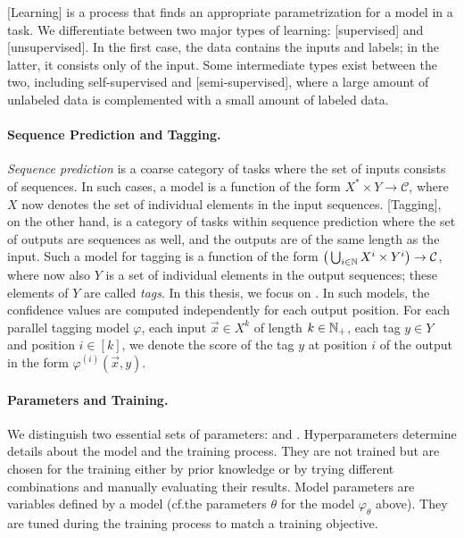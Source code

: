 \documentclass[../document.tex]{subfiles}
\begin{document}
    [Learning] is a process that finds an appropriate parametrization for a model in a task.
    We differentiate between two major types of learning: [supervised] and [unsupervised].
    In the first case, the data contains the inputs and labels; in the latter, it consists only of the input.
    Some intermediate types exist between the two, including self-supervised and [semi-supervised], where a large amount of unlabeled data is complemented with a small amount of labeled data.

    \paragraph{Sequence Prediction and Tagging.}
    \emph{Sequence prediction} is a coarse category of tasks where the set of inputs consists of sequences.
    In such cases, a model is a function of the form \(X^* \times Y \to \mathcal{C}\), where \(X\) now denotes the set of individual elements in the input sequences.
    [Tagging], on the other hand, is a category of tasks within sequence prediction where the set of outputs are sequences as well, and the outputs are of the same length as the input.
    Such a model for tagging is a function of the form \(\big( \bigcup_{i \in \mathbb{N}} X^i \times Y^i \big) \to \mathcal{C}\), where now also \(Y\) is a set of individual elements in the output sequences; these elements of \(Y\) are called \emph{tags}.
    In this thesis, we focus on .
    In such models, the confidence values are computed independently for each output position.
    For each parallel tagging model \(\varphi\), each input \(\vec{x} \in X^k\) of length \(k \in \mathbb{N}_+\), each tag \(y\in Y\) and position \(i \in [k]\), we denote the score of the tag \(y\) at position \(i\) of the output in the form \(\varphi^{(i)}(\vec{x}, y)\).

    \paragraph{Parameters and Training.}
    We distinguish two essential sets of parameters:  and .
    Hyperparameters determine details about the model and the training process. %
    They are not trained but are chosen for the training either by prior knowledge or by trying different combinations and manually evaluating their results.
    Model parameters are variables defined by a model (cf.\@ the parameters \(\theta\) for the model \(\varphi_{\theta}\) above). They are tuned during the training process to match a training objective.
\end{document}

